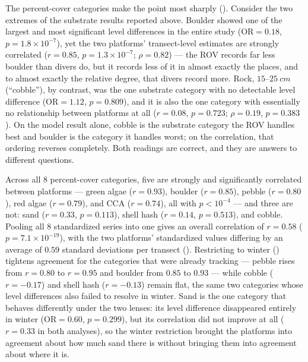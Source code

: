 \documentclass[11pt]{article}
\begin{document}
The percent-cover categories make the point most sharply
().
Consider the two extremes of the substrate results reported above.
Boulder showed one of the largest and most significant level differences in
the entire study ($\mathrm{OR}=0.18$, $p=1.8\times10^{-7}$), yet the two
platforms' transect-level estimates are strongly correlated ($r=0.85$,
$p=1.3\times10^{-7}$; $\rho=0.82$) --- the ROV records far less boulder than
divers do, but it records less of it in almost exactly the places, and to
almost exactly the relative degree, that divers record more.
Rock, $15$--$25~cm$ (``cobble''), by contrast, was the one substrate category
with no detectable level difference ($\mathrm{OR}=1.12$, $p=0.809$),
and it is also the one category with essentially no relationship between
platforms at all ($r=0.08$, $p=0.723$; $\rho=0.19$, $p=0.383$).
On the model result alone, cobble is the substrate category the ROV handles
best and boulder is the category it handles worst; on the correlation, that
ordering reverses completely.
Both readings are correct, and they are answers to different questions.

Across all 8 percent-cover categories, five are strongly and significantly
correlated between platforms --- green algae ($r=0.93$), boulder ($r=0.85$),
pebble ($r=0.80$), red algae ($r=0.79$), and CCA ($r=0.74$), all with
$p<10^{-4}$ --- and three are not: sand ($r=0.33$, $p=0.113$), shell hash
($r=0.14$, $p=0.513$), and cobble.
Pooling all 8 standardized series into one gives an overall correlation of
$r=0.58$ ($p=7.1\times10^{-19}$), with the two platforms' standardized values
differing by an average of $0.59$ standard deviations per transect
().
Restricting to winter () tightens agreement for the
categories that were already tracking --- pebble rises from $r=0.80$ to
$r=0.95$ and boulder from $0.85$ to $0.93$ --- while cobble ($r=-0.17$) and
shell hash ($r=-0.13$) remain flat, the same two categories whose level
differences also failed to resolve in winter.
Sand is the one category that behaves differently under the two lenses: its
level difference disappeared entirely in winter ($\mathrm{OR}=0.60$,
$p=0.299$), but its correlation did not improve at all ($r=0.33$ in both
analyses), so the winter restriction brought the platforms into agreement
about how much sand there is without bringing them into agreement about where
it is.
\end{document}
